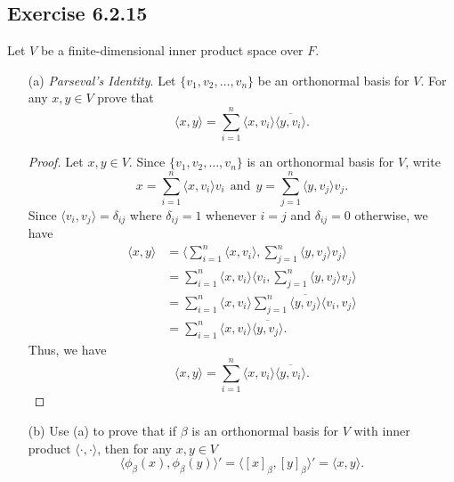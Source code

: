 \subsection*{Exercise 6.2.15} Let \( V  \) be a finite-dimensional inner product space over \( F  \).
\begin{enumerate}
    \item[(a)] \textit{Parseval's Identity}. Let \( \{ {v}_{1}, {v}_{2}, \dots, {v}_{n} \}  \) be an orthonormal basis for \( V  \). For any \( x,y \in V  \) prove that 
        \[  \langle x , y \rangle = \sum_{ i=1  }^{ n } \langle x , {v}_{i} \rangle \overline{\langle y , {v}_{i} \rangle}. \] 
        \begin{proof}
        Let \( x,y \in V  \). Since \( \{ {v}_{1}, {v}_{2}, \dots, {v}_{n} \}   \) is an orthonormal basis for \( V  \), write  
        \[   x = \sum_{ i=1  }^{ n } \langle x , {v}_{i} \rangle {v}_{i} \ \ \text{and} \ \ y = \sum_{ j=1  }^{ n  } \langle y , {v}_{j} \rangle {v}_{j}. \]
        Since \( \langle {v}_{i}  ,  {v}_{j} \rangle = {\delta}_{ij}  \) where \( {\delta}_{ij} = 1 \) whenever \( i = j  \) and \( {\delta}_{ij} = 0  \) otherwise, we have
        \begin{align*}
            \langle x , y \rangle &= \Big\langle \sum_{ i=1  }^{ n } \langle x , {v}_{i} \rangle, \sum_{ j=1 }^{ n  } \langle y , {v}_{j} \rangle {v}_{j}  \Big\rangle \\
                                  &= \sum_{ i=1  }^{ n } \langle x , {v}_{i} \rangle \Big\langle {v}_{i} ,  \sum_{ j=1 }^{ n } \langle y , {v}_{j} \rangle {v}_{j} \Big\rangle \\ 
                                  &= \sum_{ i=1  }^{ n } \langle x , {v}_{i} \rangle \sum_{ j=1  }^{ n }  \overline{\langle y , {v}_{j} \rangle } \langle {v}_{i} ,  {v}_{j} \rangle  \\
                                  &= \sum_{ i=1  }^{ n } \langle x  ,  {v}_{i} \rangle \overline{\langle y , {v}_{j} \rangle}.
        \end{align*}
        Thus, we have
            \[  \langle x , y \rangle = \sum_{ i=1  }^{ n } \langle x  , {v}_{i} \rangle \overline{\langle y , {v}_{i} \rangle}. \]
        \end{proof}
    \item[(b)] Use (a) to prove that if \( \beta  \) is an orthonormal basis for \( V  \) with inner product \( \langle \cdot , \cdot \rangle \), then for any \( x,y \in V  \)
        \[  \langle {\phi}_{\beta}(x) , \phi_{\beta}(y) \rangle' = \langle [x]_{\beta} , [y]_{\beta} \rangle' = \langle x , y \rangle. \]

\end{enumerate}

